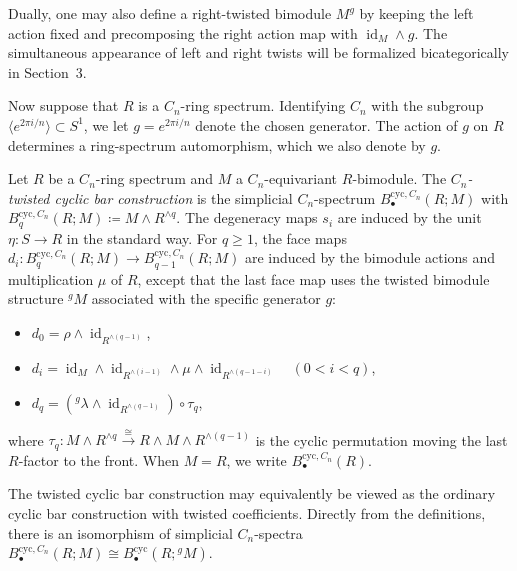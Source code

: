 \documentclass[11pt,oneside]{amsart}
\DeclareMathOperator{\id}{id}
\numberwithin{equation}{section}
\numberwithin{figure}{section}
\theoremstyle{plain}
\theoremstyle{definition}
\theoremstyle{remark}
\begin{document}
\begin{remark}\label{rem:right-twisted-bimodule}
Dually, one may also define a right-twisted bimodule $M^g$ by keeping the left
action fixed and precomposing the right action map with $\id_M \wedge g$.
The simultaneous appearance of left and right twists will be formalized
bicategorically in Section~3.
\end{remark}
 

Now suppose that \(R\) is a \(C_n\)-ring spectrum. Identifying $C_n$ with the subgroup $\langle e^{2\pi i/n}\rangle \subset S^1$, we let $g=e^{2\pi i/n}$ denote the chosen generator.
 The action of \(g\)
on \(R\) determines a ring-spectrum automorphism, which we also
denote by \(g\).


\begin{definition}
Let $R$ be a $C_n$-ring spectrum and $M$ a \(C_n\)-equivariant $R$-bimodule. The \emph{$C_n$-twisted cyclic bar construction} is the
simplicial \(C_n\)-spectrum $B^{\mathrm{cyc},C_n}_\bullet(R; M)$ with
\(
B^{\mathrm{cyc},C_n}_q(R; M) \coloneqq M \wedge R^{\wedge q}.
\)
The degeneracy maps $s_i$ are induced by the unit $\eta \colon S \to R$ in the standard way. For $q \ge 1$, the face maps \(d_i\colon
B_q^{\mathrm{cyc},C_n}(R;M)
\to
B_{q-1}^{\mathrm{cyc},C_n}(R;M)\) are induced by the bimodule actions and multiplication $\mu$ of $R$, except that the last face map uses the twisted
bimodule structure ${}^gM$  associated with the specific generator $g$:
\begin{itemize}
    \item $d_0 = \rho \wedge \id_{R^{\wedge (q-1)}}$,
    \item $d_i = \id_{M} \wedge \id_{R^{\wedge (i-1)}} \wedge \mu \wedge \id_{R^{\wedge (q-1-i)}} \quad (0 < i < q)$,
    \item $d_q = ({}^g\lambda \wedge \id_{R^{\wedge (q-1)}}) \circ \tau_q$,
\end{itemize}
where $\tau_q \colon M \wedge R^{\wedge q} \xrightarrow{\cong} R \wedge M \wedge R^{\wedge (q-1)}$ is the cyclic
permutation moving the last $R$-factor to the front.
When $M=R$, we write $B^{\mathrm{cyc},C_n}_\bullet(R)$.
\end{definition}

\begin{remark}\label{rem:twisted-bar-equivalence}
The twisted cyclic bar construction may equivalently be viewed as the
ordinary cyclic bar construction with twisted coefficients. Directly
from the definitions, there is an isomorphism of simplicial
\(C_n\)-spectra
\(
B^{\mathrm{cyc},C_n}_\bullet(R;M)
\cong
B^{\mathrm{cyc}}_\bullet(R;{}^gM).
\)
\end{remark}
 
\end{document}
